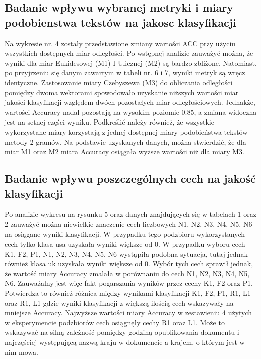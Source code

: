 \documentclass{classrep}
\begin{document}
\subsection{Badanie wpływu wybranej metryki i miary podobienstwa tekstów na jakosc klasyfikacji}
Na wykresie nr. 4 zostały przedstawione zmiany wartości ACC przy użyciu wszystkich dostępnych miar odległości. Po wstępnej analizie zauważyć można, że wyniki dla miar Eukidesowej (M1) I Ulicznej (M2) są bardzo zbliżone. Natomiast, po przyjrzeniu się danym zawartym w tabeli nr. 6 i 7, wyniki metryk są wręcz identyczne. Zastosowanie miary Czebyszewa (M3) do obliczania odległości pomiędzy dwoma wektorami spowodowało uzyskanie niższych wartości miar jakości klasyfikacji względem dwóch pozostałych miar odległościowych. Jednakże, wartości Accuracy nadal pozostają na wysokim poziomie 0.85, a zmiana widoczna jest na setnej części wyniku. Podkreślić należy również, że wszystkie wykorzystane miary korzystają z jednej dostępnej miary podobieństwa tekstów - metody 2-gramów.  Na podstawie uzyskanych danych, można stwierdzić, że dla miar M1 oraz M2 miara Accuracy osiągała wyższe wartości niż dla miary M3.  
\\
\subsection{Badanie wpływu poszczególnych cech na jakość klasyfikacji}
Po analizie wykresu na rysunku 5 oraz danych znajdujących się w tabelach 1 oraz 2 zauważyć można niewielkie znaczenie cech liczbowych N1, N2, N3, N4, N5, N6 na osiągane wyniki klasyfikacji. W przypadku tego podzbioru wykorzystanych cech tylko klasa usa uzyskała wyniki większe od 0. W przypadku wyboru cech K1, F2, P1, N1, N2, N3, N4, N5, N6 wystąpiła podobna sytuacja, tutaj jednak również klasa uk uzyskała wyniki większe od 0. Wybór tych cech sprawił jednak, że wartość miary Accuracy zmalała w porównaniu do cech N1, N2, N3, N4, N5, N6. Zauważalny jest więc fakt pogarszania wyników przez cechy K1, F2 oraz P1. Potwierdza to również różnica między wynikami klasyfikacji K1, F2, P1, R1, L1 oraz R1, L1 gdzie wyniki klasyfikacji z większą ilością cech wskazywały na mniejsze Accuracy. Najwyższe wartości miary Accuracy w zestawieniu 4 użytych w eksperymencie podzbiorów cech osiągnęły cechy R1 oraz L1. Może to wskazywać na silną zależność pomiędzy godziną opublikowania dokumentu i najczęściej występującą nazwą kraju w dokumencie a krajem, o którym jest w nim mowa.
\end{document}
